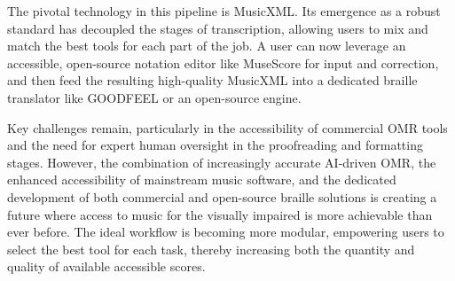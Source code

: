 The pivotal technology in this pipeline is \gls{MusicXML}. Its emergence as a robust standard has decoupled the stages of transcription, allowing users to mix and match the best tools for each part of the job. A user can now leverage an accessible, open-source notation editor like MuseScore for input and correction, and then feed the resulting high-quality \gls{MusicXML} into a dedicated braille translator like GOODFEEL or an open-source engine.

Key challenges remain, particularly in the accessibility of commercial \gls{OMR} tools and the need for expert human oversight in the proofreading and formatting stages. However, the combination of increasingly accurate AI-driven \gls{OMR}, the enhanced accessibility of mainstream music software, and the dedicated development of both commercial and open-source braille solutions is creating a future where access to music for the visually impaired is more achievable than ever before. The ideal workflow is becoming more modular, empowering users to select the best tool for each task, thereby increasing both the quantity and quality of available accessible scores.
